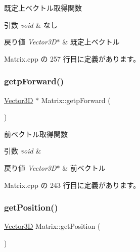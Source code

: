 既定上ベクトル取得関数 


\begin{DoxyParams}{引数}
{\em void} & なし \\
\hline
\end{DoxyParams}

\begin{DoxyRetVals}{戻り値}
{\em Vector3\+D$\ast$} & 既定上ベクトル \\
\hline
\end{DoxyRetVals}


 Matrix.\+cpp の 257 行目に定義があります。

\mbox{\label{class_matrix_a384555a3c303692932b15eef7b3abf3e}} 
\subsubsection{\texorpdfstring{getp\+Forward()}{getpForward()}}
{\footnotesize\ttfamily \mbox{\hyperlink{class_vector3_d}{Vector3D}} $\ast$ Matrix\+::getp\+Forward (\begin{DoxyParamCaption}{ }\end{DoxyParamCaption})}



前ベクトル取得関数 


\begin{DoxyParams}{引数}
{\em void} & \\
\hline
\end{DoxyParams}

\begin{DoxyRetVals}{戻り値}
{\em Vector3\+D$\ast$} & 前ベクトル \\
\hline
\end{DoxyRetVals}


 Matrix.\+cpp の 243 行目に定義があります。

\mbox{\label{class_matrix_af715d6df123065b56f602ea7db05238d}} 
\subsubsection{\texorpdfstring{get\+Position()}{getPosition()}}
{\footnotesize\ttfamily \mbox{\hyperlink{class_vector3_d}{Vector3D}} Matrix\+::get\+Position (\begin{DoxyParamCaption}{ }\end{DoxyParamCaption})}



